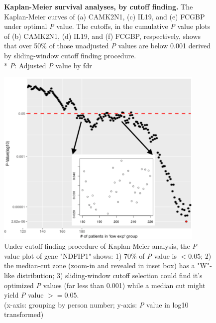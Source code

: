\documentclass[preprint,12pt]{elsarticle}
\newcommand{\bcaption}[2]{\caption{\textbf{#1} #2}}
\newenvironment{MyColorPar}[1]{%
    \leavevmode\color{#1}\ignorespaces%
}{%
}%
\begin{document}
\begin{MyColorPar}{blue}
\begin{figure}[hp]
\bcaption{Kaplan-Meier survival analyses, by cutoff finding.}
{The Kaplan-Meier curves of (a) CAMK2N1, (c) IL19, and (e) FCGBP under optimal \textit{P} value. 
The cutoffs, in the cumulative \textit{P} value plots of (b) CAMK2N1, (d) IL19, and (f) FCGBP, respectively,
shows that over 50\% of those unadjusted \textit{P} values are below 0.001 derived by sliding-window cutoff finding procedure.\\
* \textit{P}: Adjusted \textit{P} value by \acrfull{fdr}
}
\label{fig:figure4}
\end{figure}






\begin{figure}[ht]
    \centering
    \includegraphics[width=10cm]{Rplot_pvaluePlot_NDFIP1.pdf}
    \caption{Under cutoff-finding procedure of Kaplan-Meier analysis, the \textit{P}-value plot of gene "NDFIP1" shows: 1) 70\% of \textit{P} value is $<0.05$; 2) the median-cut zone (zoom-in and revealed in inset box) has a "W"-like distribution; 3) sliding-window cutoff selection could find it's optimized \textit{P} values (far less than 0.001) while a median cut might yield \textit{P} value $>=0.05$.\\
    (x-axis: grouping by person number; y-axis: \textit{P} value in log10 transformed)}
    \label{fig:pvaluePlot_NDFIP1}
\end{figure}


\end{MyColorPar}
\end{document}
